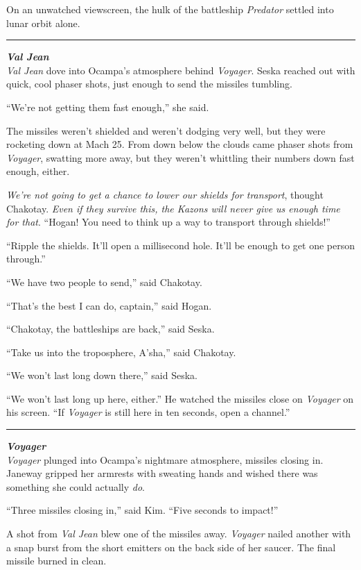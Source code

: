 \documentclass[twoside,letterpaper,12pt]{memoir}
\begin{document}
On an unwatched viewscreen, the hulk of the battleship \textit{Predator} settled into lunar orbit alone.

\fancybreak{\rule{3cm}{0.4 pt}}
\noindent\textit{\textbf{Val Jean}}\\

\textit{Val Jean} dove into Ocampa's atmosphere behind \textit{Voyager}. Seska reached out with quick, cool phaser shots, just enough to send the missiles tumbling.

``We're not getting them fast enough,'' she said.

The missiles weren't shielded and weren't dodging very well, but they were rocketing down at Mach 25. From down below the clouds came phaser shots from \textit{Voyager}, swatting more away, but they weren't whittling their numbers down fast enough, either.

\textit{We're not going to get a chance to lower our shields for transport}, thought Chakotay. \textit{Even if they survive this, the Kazons will never give us enough time for that}. ``Hogan! You need to think up a way to transport through shields!''

``Ripple the shields. It'll open a millisecond hole. It'll be enough to get one person through.''

``We have two people to send,'' said Chakotay.

``That's the best I can do, captain,'' said Hogan.

``Chakotay, the battleships are back,'' said Seska.

``Take us into the troposphere, A'sha,'' said Chakotay.

``We won't last long down there,'' said Seska.

``We won't last long up here, either.'' He watched the missiles close on \textit{Voyager} on his screen. ``If \textit{Voyager} is still here in ten seconds, open a channel.''

\fancybreak{\rule{3cm}{0.4 pt}}
\noindent\textit{\textbf{Voyager}}\\

\textit{Voyager} plunged into Ocampa's nightmare atmosphere, missiles closing in. Janeway gripped her armrests with sweating hands and wished there was something she could actually \textit{do}.

``Three missiles closing in,'' said Kim. ``Five seconds to impact!''

A shot from \textit{Val Jean} blew one of the missiles away. \textit{Voyager} nailed another with a snap burst from the short emitters on the back side of her saucer. The final missile burned in clean.
\end{document}
